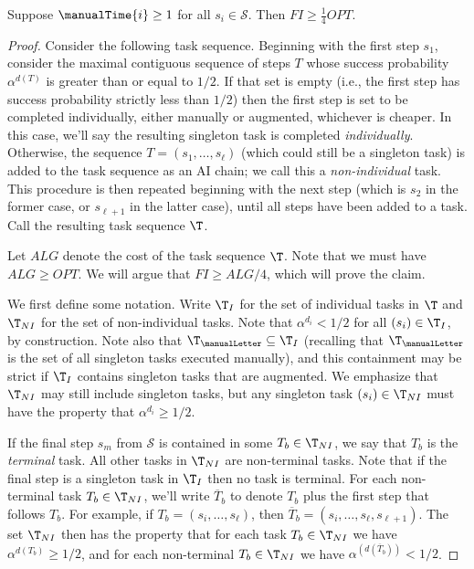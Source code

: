 \begin{lem}
\label{lem:FI.lower.bound.4}
    Suppose $\manualTime{i} \geq 1$ for all $s_i \in \mathcal{S}$.
    Then $FI \geq \tfrac{1}{4}OPT$.
\end{lem}
\begin{proof}

    Consider the following task sequence.
    Beginning with the first step $s_1$, consider the maximal contiguous sequence of steps $T$ whose success probability $\alpha^{d(T)}$ is greater than or equal to $1/2$.
    If that set is empty (i.e., the first step has success probability strictly less than $1/2$) then the first step is set to be completed individually, either manually or augmented, whichever is cheaper.
    In this case, we'll say the resulting singleton task is completed \emph{individually}.
    Otherwise, the sequence $T = (s_1, \dotsc, s_\ell)$ (which could still be a singleton task) is added to the task sequence as an AI chain; we call this a \emph{non-individual} task.
    This procedure is then repeated beginning with the next step (which is $s_2$ in the former case, or $s_{\ell+1}$ in the latter case), until all steps have been added to a task.
    Call the resulting task sequence $\T$.

    \medskip

    Let $ALG$ denote the cost of the task sequence $\T$.
    Note that we must have $ALG \geq OPT$.
    We will argue that $FI \geq ALG/4$, which will prove the claim.

    \medskip

    We first define some notation.
    Write $\T_I$ for the set of individual tasks in $\T$ and $\T_{NI}$ for the set of non-individual tasks.
    Note that $\alpha^{d_i} < 1/2$ for all $(s_i) \in \T_I$, by construction.
    Note also that $\T_{\manualLetter} \subseteq \T_I$ (recalling that $\T_{\manualLetter}$ is the set of all singleton tasks executed manually), and this containment may be strict if $\T_I$ contains singleton tasks that are augmented.
    We emphasize that $\T_{NI}$ may still include singleton tasks, but any singleton task $(s_i) \in \T_{NI}$ must have the property that $\alpha^{d_i} \geq 1/2$.

    If the final step $s_m$ from $\mathcal{S}$ is contained in some $T_b \in \T_{NI}$, we say that $T_b$ is the \emph{terminal} task.
    All other tasks in $\T_{NI}$ are non-terminal tasks.
Note that if the final step is a singleton task in $\T_I$ then no task is terminal.
    For each non-terminal task $T_b \in \T_{NI}$, we'll write $\overline{T}_b$ to denote $T_b$ plus the first step that follows $T_b$.
    For example, if $T_b = (s_i, \dotsc, s_\ell)$, then $\overline{T}_b = (s_i, \dotsc, s_\ell, s_{\ell+1})$.
    The set $\T_{NI}$ then has the property that for each task $T_b \in \T_{NI}$ we have $\alpha^{d(T_b)} \geq 1/2$, and for each non-terminal $T_b \in \T_{NI}$ we have $\alpha^{(d(\overline{T}_b))} < 1/2$.


\end{proof}
